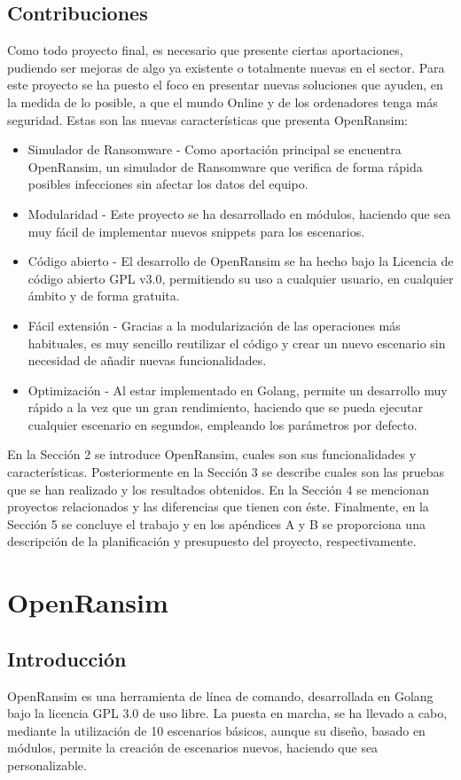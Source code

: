 \documentclass[a4paper,12pt]{article}
\begin{document}
\subsection{Contribuciones}
Como todo proyecto final, es necesario que presente ciertas aportaciones, pudiendo ser mejoras de algo ya existente o totalmente nuevas en el sector. Para este proyecto se ha puesto el foco en presentar nuevas soluciones que ayuden, en la medida de lo posible, a que el mundo Online y de los ordenadores tenga más seguridad. Estas son las nuevas características que presenta OpenRansim: 
\begin{itemize}
	\item Simulador de Ransomware - Como aportación principal se encuentra OpenRansim, un simulador de Ransomware que verifica de forma rápida posibles infecciones sin afectar los datos del equipo.
	\item Modularidad - Este proyecto se ha desarrollado en módulos, haciendo que sea muy fácil de implementar nuevos snippets para los escenarios.
	\item Código abierto - El desarrollo de OpenRansim se ha hecho bajo la Licencia de código abierto GPL v3.0, permitiendo su uso a cualquier usuario, en cualquier ámbito y de forma gratuita.
	\item Fácil extensión - Gracias a la modularización de las operaciones más habituales, es muy sencillo reutilizar el código y crear un nuevo escenario sin necesidad de añadir nuevas funcionalidades.
	\item Optimización - Al estar implementado en Golang, permite un desarrollo muy rápido a la vez que un gran rendimiento, haciendo que se pueda ejecutar cualquier escenario en segundos, empleando los parámetros por defecto.
\end{itemize}
En la Sección 2 se introduce OpenRansim, cuales son sus funcionalidades y características. Posteriormente en la Sección 3 se describe cuales son las pruebas que se han realizado y los resultados obtenidos. En la Sección 4 se mencionan proyectos relacionados y las diferencias que tienen con éste. Finalmente, en la Sección 5 se concluye el trabajo y en los apéndices A y B se proporciona una descripción de la planificación y presupuesto del proyecto, respectivamente.
\section{OpenRansim}
\subsection{Introducción}
OpenRansim es una herramienta de línea de comando, desarrollada en Golang bajo la licencia GPL 3.0 de uso libre. La puesta en marcha, se ha llevado a cabo, mediante la utilización de 10 escenarios básicos, aunque su diseño, basado en módulos, permite la creación de escenarios nuevos, haciendo que sea personalizable.
\end{document}
